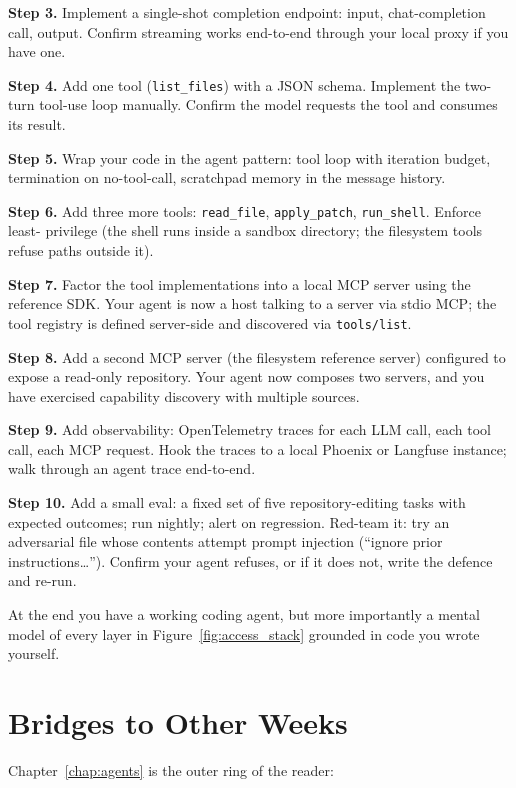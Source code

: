 \textbf{Step 3.} Implement a single-shot completion endpoint:
input, chat-completion call, output. Confirm streaming works
end-to-end through your local proxy if you have one.

\textbf{Step 4.} Add one tool (\texttt{list\_files}) with a JSON
schema. Implement the two-turn tool-use loop manually. Confirm
the model requests the tool and consumes its result.

\textbf{Step 5.} Wrap your code in the agent pattern: tool loop
with iteration budget, termination on no-tool-call, scratchpad
memory in the message history.

\textbf{Step 6.} Add three more tools: \texttt{read\_file},
\texttt{apply\_patch}, \texttt{run\_shell}. Enforce least-
privilege (the shell runs inside a sandbox directory; the
filesystem tools refuse paths outside it).

\textbf{Step 7.} Factor the tool implementations into a local
MCP server using the reference SDK. Your agent is now a host
talking to a server via stdio MCP; the tool registry is defined
server-side and discovered via \texttt{tools/list}.

\textbf{Step 8.} Add a second MCP server (the filesystem
reference server) configured to expose a read-only repository.
Your agent now composes two servers, and you have exercised
capability discovery with multiple sources.

\textbf{Step 9.} Add observability: OpenTelemetry traces for
each LLM call, each tool call, each MCP request. Hook the traces
to a local Phoenix or Langfuse instance; walk through an
agent trace end-to-end.

\textbf{Step 10.} Add a small eval: a fixed set of five
repository-editing tasks with expected outcomes; run nightly;
alert on regression. Red-team it: try an adversarial file whose
contents attempt prompt injection (``ignore prior
instructions\ldots{}''). Confirm your agent refuses, or if it
does not, write the defence and re-run.

At the end you have a working coding agent, but more importantly
a mental model of every layer in Figure~\ref{fig:access_stack}
grounded in code you wrote yourself.

\section{Bridges to Other Weeks}

Chapter~\ref{chap:agents} is the outer ring of the reader:

